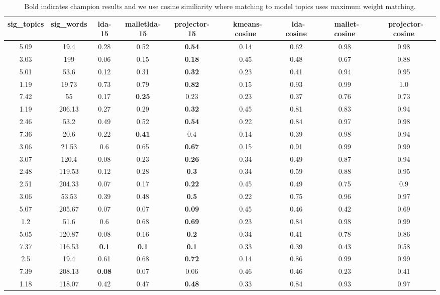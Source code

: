 \begin{table}

{\small
\begin{tabular}{|c|c|c|c|c|c|c|c|c|}
\hline 
sig\_topics &sig\_words &lda-15 &malletlda-15 &projector-15 &~kmeans-cosine &~lda-cosine &~mallet-cosine &~projector-cosine \\
 \hline 
5.09  &19.4  &0.28  &0.52  &\textbf{0.54}
  &0.14  &0.62  &0.98  &0.98  \\
 \hline 
3.03  &199  &0.06  &0.15  &\textbf{0.18}
  &0.45  &0.48  &0.67  &0.88  \\
 \hline 
5.01  &53.6  &0.12  &0.31  &\textbf{0.32}
  &0.23  &0.41  &0.94  &0.95  \\
 \hline 
1.19  &19.73  &0.73  &0.79  &\textbf{0.82}
  &0.15  &0.93  &0.99  &1.0  \\
 \hline 
7.42  &55  &0.17  &\textbf{0.25}
  &0.23  &0.23  &0.37  &0.76  &0.73  \\
 \hline 
1.19  &206.13  &0.27  &0.29  &\textbf{0.32}
  &0.45  &0.81  &0.83  &0.94  \\
 \hline 
2.46  &53.2  &0.49  &0.52  &\textbf{0.54}
  &0.22  &0.84  &0.97  &0.98  \\
 \hline 
7.36  &20.6  &0.22  &\textbf{0.41}
  &0.4  &0.14  &0.39  &0.98  &0.94  \\
 \hline 
3.06  &21.53  &0.6  &0.65  &\textbf{0.67}
  &0.15  &0.91  &0.99  &0.99  \\
 \hline 
3.07  &120.4  &0.08  &0.23  &\textbf{0.26}
  &0.34  &0.49  &0.87  &0.94  \\
 \hline 
2.48  &119.53  &0.12  &0.28  &\textbf{0.3}
  &0.34  &0.59  &0.88  &0.95  \\
 \hline 
2.51  &204.33  &0.07  &0.17  &\textbf{0.22}
  &0.45  &0.49  &0.75  &0.9  \\
 \hline 
3.06  &53.53  &0.39  &0.48  &\textbf{0.5}
  &0.22  &0.75  &0.96  &0.97  \\
 \hline 
5.07  &205.67  &0.07  &0.07  &\textbf{0.09}
  &0.45  &0.46  &0.42  &0.69  \\
 \hline 
1.2  &51.6  &0.6  &0.68  &\textbf{0.69}
  &0.23  &0.84  &0.98  &0.99  \\
 \hline 
5.05  &120.87  &0.08  &0.16  &\textbf{0.2}
  &0.34  &0.41  &0.78  &0.86  \\
 \hline 
7.37  &116.53  &\textbf{0.1}
  &\textbf{0.1}
  &\textbf{0.1}
  &0.33  &0.39  &0.43  &0.58  \\
 \hline 
2.5  &19.4  &0.61  &0.68  &\textbf{0.72}
  &0.14  &0.86  &0.99  &0.99  \\
 \hline 
7.39  &208.13  &\textbf{0.08}
  &0.07  &0.06  &0.46  &0.46  &0.23  &0.41  \\
 \hline 
1.18  &118.07  &0.42  &0.47  &\textbf{0.48}
  &0.33  &0.84  &0.93  &0.97  \\
 \hline 

\end{tabular}

}
\caption{Bold indicates champion results and we use cosine similiarity where matching
to model topics uses maximum weight matching.}
\label{tab:cosine}
\end{table}


